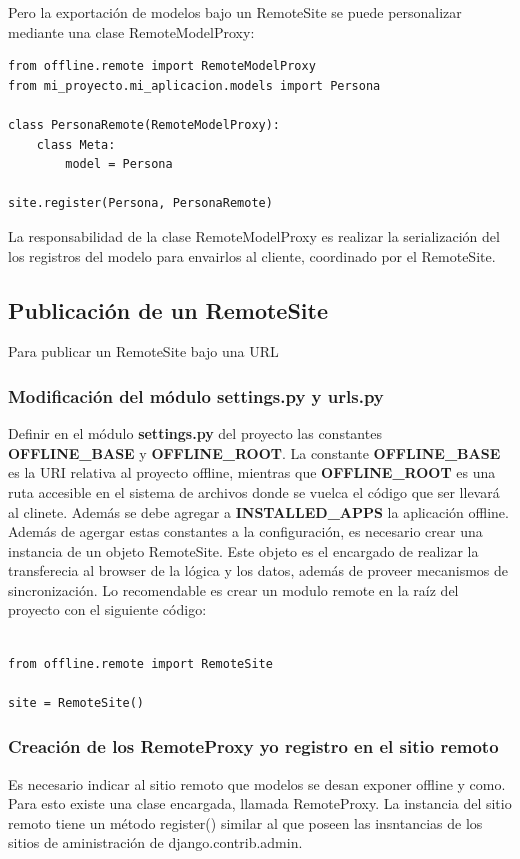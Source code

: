 \documentclass[a4paper]{report}
\begin{document}
Pero la exportación de modelos bajo un RemoteSite se puede personalizar
mediante una clase RemoteModelProxy:

\begin{lstlisting}[style=python, label=RemoteModelProxy para un modelo]
from offline.remote import RemoteModelProxy
from mi_proyecto.mi_aplicacion.models import Persona

class PersonaRemote(RemoteModelProxy):
    class Meta:
        model = Persona
        
site.register(Persona, PersonaRemote)
\end{lstlisting}

La responsabilidad de la clase RemoteModelProxy es realizar la serialización
del los registros del modelo para envairlos al cliente, coordinado por el
RemoteSite.

\subsection{Publicación de un RemoteSite}
Para publicar un RemoteSite bajo una URL

\subsubsection{Modificación del módulo settings.py y urls.py}
Definir en el módulo \textbf{settings.py} del proyecto las constantes
\textbf{OFFLINE\_BASE} y \textbf{OFFLINE\_ROOT}. La constante
\textbf{OFFLINE\_BASE} es la URI relativa al proyecto offline, mientras que 
\textbf{OFFLINE\_ROOT} es una ruta accesible en el sistema de archivos donde
se vuelca el código que ser llevará al clinete.
Además se debe agregar a \textbf{INSTALLED\_APPS} la aplicación offline.
Además de agergar estas constantes a la configuración, es necesario crear
una instancia de un objeto RemoteSite. Este objeto es el encargado de realizar
la transferecia al browser de la lógica y los datos, además de proveer
mecanismos de sincronización. Lo recomendable es crear un modulo remote en 
la raíz del proyecto con el siguiente código:
\begin{lstlisting}[style=python,
		   label=offlineization-site,
		   caption=Creando el sitio remoto]

from offline.remote import RemoteSite

site = RemoteSite()
\end{lstlisting}

\subsubsection{Creación de los RemoteProxy y\/o registro en el sitio remoto}
Es necesario indicar al sitio remoto que modelos se desan exponer offline y
como. Para esto existe una clase encargada, llamada RemoteProxy. 
La instancia del sitio remoto tiene un método register() similar al que poseen
las insntancias de los sitios de aministración de django.contrib.admin.
\end{document}
